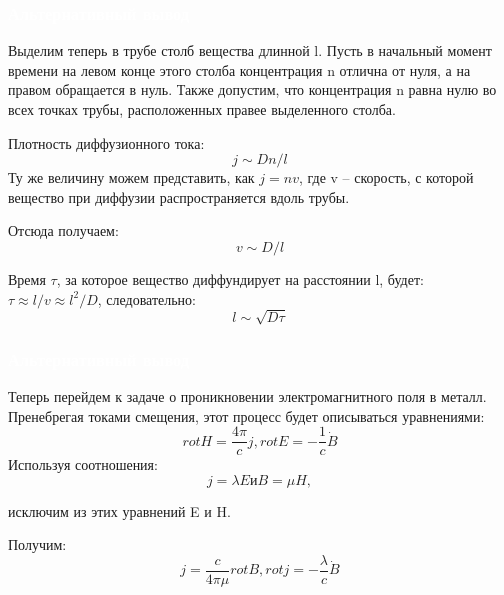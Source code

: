 \documentclass[aspectratio=169]{beamer}
\begin{document}
\begin{frame}
\frametitle{\textcolor{white}{Альтернативный вывод}}
Выделим теперь в трубе столб вещества длинной l. Пусть в начальный момент времени на левом конце этого столба концентрация n отлична от нуля, а на правом обращается в нуль. Также допустим, что концентрация n равна нулю во всех точках трубы, расположенных правее выделенного столба. 

Плотность диффузионного тока: 
\begin{equation*}
j \sim Dn/l 
\end{equation*}
Ту же величину можем представить, как $j = nv$, где v -- скорость, с которой вещество при диффузии распространяется вдоль трубы.

Отсюда получаем: 
\begin{equation*}
v \sim D/l
\end{equation*}

Время $\tau$, за которое вещество диффундирует на расстоянии l, будет: $\tau \approx l/v \approx l^2/D$, следовательно:
\begin{equation*}
l \sim \sqrt{D \tau}
\end{equation*}
\end{frame}

\begin{frame}
\frametitle{\textcolor{white}{Альтернативный вывод}}

Теперь перейдем к задаче о проникновении электромагнитного поля в металл. Пренебрегая токами смещения, этот процесс будет описываться уравнениями:
\begin{equation*}
rot H = \frac{4 \pi}{c} j, rot E = - \frac{1}{c} \dot B
\end{equation*}
Используя соотношения: 
\begin{equation*}
j = \lambda E \text{и} B = \mu H,
\end{equation*}

исключим из этих уравнений E и H.

Получим:
\begin{equation*}
j = \frac{c}{4 \pi \mu} rot B, rot j = -\frac{\lambda}{c} \dot B
\end{equation*}

\end{frame}
\end{document}
